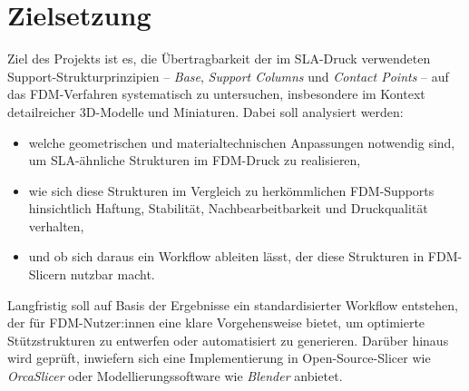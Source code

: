 \chapter{Zielsetzung}
\label{cha:Zielsetzung}

Ziel des Projekts ist es, die Übertragbarkeit der im SLA-Druck verwendeten Support-Strukturprinzipien – \textit{Base}, \textit{Support Columns} und \textit{Contact Points} – auf das FDM-Verfahren systematisch zu untersuchen, insbesondere im Kontext detailreicher 3D-Modelle und Miniaturen.  
Dabei soll analysiert werden:

\begin{itemize}
  \item welche geometrischen und materialtechnischen Anpassungen notwendig sind, um SLA-ähnliche Strukturen im FDM-Druck zu realisieren,
  \item wie sich diese Strukturen im Vergleich zu herkömmlichen FDM-Supports hinsichtlich Haftung, Stabilität, Nachbearbeitbarkeit und Druckqualität verhalten,
  \item und ob sich daraus ein Workflow ableiten lässt, der diese Strukturen in FDM-Slicern nutzbar macht.
\end{itemize}

Langfristig soll auf Basis der Ergebnisse ein standardisierter Workflow entstehen, der für FDM-Nutzer:innen eine klare Vorgehensweise bietet, um optimierte Stützstrukturen zu entwerfen oder automatisiert zu generieren.  
Darüber hinaus wird geprüft, inwiefern sich eine Implementierung in Open-Source-Slicer wie \textit{OrcaSlicer} oder Modellierungssoftware wie \textit{Blender} anbietet.

